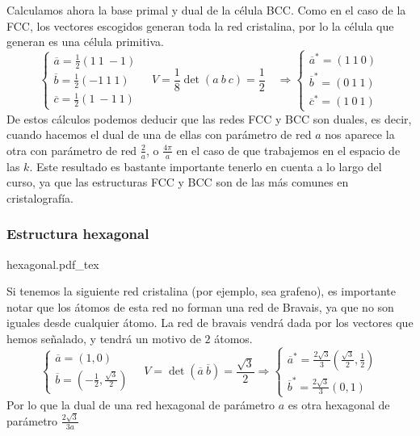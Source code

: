 \documentclass[leqno]{article}
\newcommand{\incfig}[1]{%
\center
\def\svgwidth{0.9\columnwidth}
{#1.pdf_tex}
}
\begin{document}
Calculamos ahora la base primal y dual de la célula BCC. Como en el caso de la FCC, los vectores escogidos generan toda la red cristalina, por lo la célula que generan es una célula primitiva.
\[
\begin{cases}
  \overline{a} = \frac{1}{2} (1\ 1\ -1) \\
  \overline{b} = \frac{1}{2} (-1\ 1\ 1) \\
  \overline{c} = \frac{1}{2} (1\ -1\ 1)
\end{cases} \quad 
V = \frac{1}{8}\det(a\ b\ c) = \frac{1}{2} \quad \Rightarrow 
\begin{cases}
  \overline{a}^* = (1\ 1\ 0)\\
  \overline{b}^* = (0\ 1\ 1 )\\
  \overline{c}^* = (1\ 0\ 1)
\end{cases} 
\] 
De estos cálculos podemos deducir que las redes FCC y BCC son duales, es decir, cuando hacemos el dual de una de ellas con parámetro de red $a$ nos aparece la otra con parámetro de red  $\frac{2}{a}$, o $\frac{4\pi}{a}$ en el caso de que trabajemos en el espacio de las $k$. Este resultado es bastante importante tenerlo en cuenta a lo largo del curso, ya que las estructuras FCC y  BCC son de las más comunes en cristalografía.

\subsubsection{Estructura hexagonal}
\begin{minipage}{\textwidth}
  \incfig{hexagonal}
\end{minipage}

Si tenemos la siguiente red cristalina (por ejemplo, sea grafeno), es importante notar que los átomos de esta red no forman una red de Bravais, ya que no son iguales desde cualquier átomo. La red de bravais vendrá dada por los vectores que hemos señalado, y tendrá un motivo de $2$ átomos.
\[
\begin{cases}
  \overline{a} = (1, 0)\\
  \overline{b} = (-\frac{1}{2}, \frac{\sqrt{3} }{2})
\end{cases} \quad V = \det(\overline{a}\ \overline{b}) = \frac{\sqrt{3} }{2} \Rightarrow 
\begin{cases}
  \overline{a}^* = \frac{2 \sqrt{3} }{3}(\frac{\sqrt{3} }{2}, \frac{1}{2}) \\
  \overline{b}^* = \frac{2 \sqrt{3} }{3}( 0, 1)
\end{cases}
\] 
Por lo que la dual de una red hexagonal de parámetro $a$ es otra hexagonal de parámetro $\frac{2 \sqrt{3}}{3a}$
\end{document}
